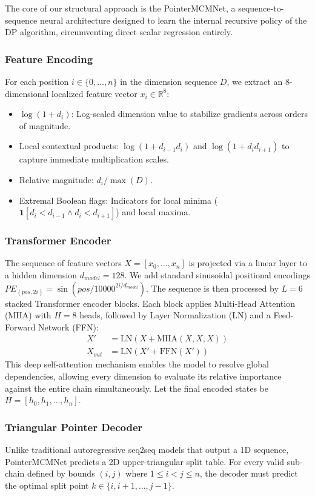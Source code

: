 \documentclass[conference]{IEEEtran}
\begin{document}
The core of our structural approach is the PointerMCMNet, a sequence-to-sequence neural architecture designed to learn the internal recursive policy of the DP algorithm, circumventing direct scalar regression entirely.

\subsubsection{Feature Encoding} 
For each position $i \in \{0, \ldots, n\}$ in the dimension sequence $D$, we extract an 8-dimensional localized feature vector $x_i \in \mathbb{R}^8$:
\begin{itemize}
    \item $\log(1 + d_i)$: Log-scaled dimension value to stabilize gradients across orders of magnitude.
    \item Local contextual products: $\log(1 + d_{i-1}d_i)$ and $\log(1 + d_id_{i+1})$ to capture immediate multiplication scales.
    \item Relative magnitude: $d_i / \max(D)$.
    \item Extremal Boolean flags: Indicators for local minima ($\mathbf{1}[d_i < d_{i-1} \land d_i < d_{i+1}]$) and local maxima.
\end{itemize}

\subsubsection{Transformer Encoder} 
The sequence of feature vectors $X = [x_0, \ldots, x_n]$ is projected via a linear layer to a hidden dimension $d_{model}=128$. We add standard sinusoidal positional encodings $PE_{(pos, 2i)} = \sin(pos / 10000^{2i/d_{model}})$. 
The sequence is then processed by $L=6$ stacked Transformer encoder blocks. Each block applies Multi-Head Attention (MHA) with $H=8$ heads, followed by Layer Normalization (LN) and a Feed-Forward Network (FFN):
\begin{align}
    X' &= \text{LN}(X + \text{MHA}(X, X, X)) \\
    X_{out} &= \text{LN}(X' + \text{FFN}(X'))
\end{align}
This deep self-attention mechanism enables the model to resolve global dependencies, allowing every dimension to evaluate its relative importance against the entire chain simultaneously. Let the final encoded states be $H = [h_0, h_1, \ldots, h_n]$.

\subsubsection{Triangular Pointer Decoder} 
Unlike traditional autoregressive seq2seq models that output a 1D sequence, PointerMCMNet predicts a 2D upper-triangular split table. For every valid sub-chain defined by bounds $(i, j)$ where $1 \le i < j \le n$, the decoder must predict the optimal split point $k \in \{i, i+1, \ldots, j-1\}$.
\end{document}
